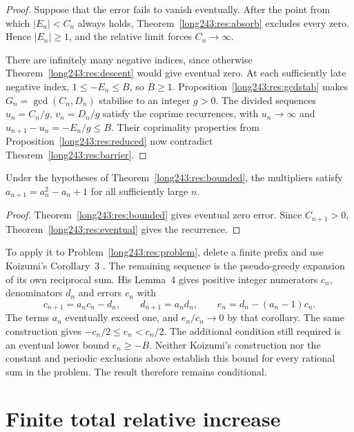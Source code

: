 \begin{proof}
Suppose that the error fails to vanish eventually. After the
point from which $|E_n|<C_n$ always holds, Theorem~\ref{long243:res:absorb} excludes every zero. Hence $|E_n|\ge1$,
and the relative limit forces $C_n\to\infty$.

There are infinitely many negative indices, since otherwise
Theorem~\ref{long243:res:descent} would give eventual zero.
At each sufficiently late negative index, $1\le-E_n\le B$, so
$B\ge1$.
Proposition~\ref{long243:res:gcdstab} makes $G_n=\gcd(C_n,D_n)$
stabilise to an integer $g>0$. The divided sequences
$u_n=C_n/g$, $v_n=D_n/g$ satisfy the coprime recurrences, with
$u_n\to\infty$ and $u_{n+1}-u_n=-E_n/g\le B$.
Their coprimality properties from Proposition~\ref{long243:res:reduced}
now contradict Theorem~\ref{long243:res:barrier}.
\end{proof}

\begin{corollary}\label{long243:res:cor}
Under the hypotheses of Theorem~\ref{long243:res:bounded}, the multipliers
satisfy $a_{n+1}=a_n^{2}-a_n+1$ for all sufficiently large $n$.
\end{corollary}

\begin{proof}
Theorem~\ref{long243:res:bounded} gives eventual zero error. Since
$C_{n+1}>0$, Theorem~\ref{long243:res:eventual} gives the recurrence.
\end{proof}

To apply it to Problem~\ref{long243:res:problem}, delete a finite prefix
and use Koizumi's Corollary~3 \cite[p.~9]{koizumi2025}. The remaining
sequence is the pseudo-greedy expansion of its own reciprocal sum.
His Lemma~4 gives positive integer numerators $c_n$, denominators $d_n$
and errors $e_n$ with
\[
 c_{n+1}=a_nc_n-d_n,\qquad d_{n+1}=a_nd_n,\qquad
 e_n=d_n-(a_n-1)c_n.
\]
The terms $a_n$ eventually exceed one, and $e_n/c_n\to0$ by that
corollary. The same construction gives $-c_n/2\le e_n<c_n/2$.
The additional condition still required is an eventual lower bound
$e_n\ge-B$. Neither Koizumi's construction nor the constant and periodic
exclusions above establish this bound for every rational sum in the
problem. The result therefore remains conditional.

\section{Finite total relative increase}\label{long243:sec:mass}

